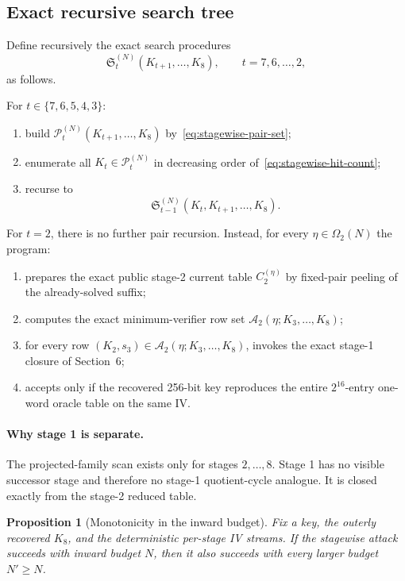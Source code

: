 \documentclass[11pt]{article}
\newtheorem{proposition}{Proposition}
\begin{document}
\subsection{Exact recursive search tree}
Define recursively the exact search procedures
\[
\mathfrak{S}_t^{(N)}(K_{t+1},\dots,K_8),
\qquad t=7,6,\dots,2,
\]
as follows.

For $t\in\{7,6,5,4,3\}$:
\begin{enumerate}[label=\arabic*.,leftmargin=1.5em]
\item build $\mathcal{P}_t^{(N)}(K_{t+1},\dots,K_8)$ by~\eqref{eq:stagewise-pair-set};
\item enumerate all $K_t\in\mathcal{P}_t^{(N)}$ in decreasing order of~\eqref{eq:stagewise-hit-count};
\item recurse to
\[
\mathfrak{S}_{t-1}^{(N)}(K_t,K_{t+1},\dots,K_8).
\]
\end{enumerate}

For $t=2$, there is no further pair recursion. Instead, for every $\eta\in\Omega_2(N)$ the program:
\begin{enumerate}[label=\arabic*.,leftmargin=1.5em]
\item prepares the exact public stage-2 current table $C_2^{(\eta)}$ by fixed-pair peeling of the already-solved suffix;
\item computes the exact minimum-verifier row set $\mathcal{A}_2(\eta;K_3,\dots,K_8)$;
\item for every row $(K_2,s_3)\in \mathcal{A}_2(\eta;K_3,\dots,K_8)$, invokes the exact stage-1 closure of Section~6;
\item accepts only if the recovered 256-bit key reproduces the entire $2^{16}$-entry one-word oracle table on the same IV.
\end{enumerate}

\paragraph{Why stage 1 is separate.}
The projected-family scan exists only for stages $2,\dots,8$. Stage 1 has no visible successor stage and therefore no stage-1 quotient-cycle analogue. It is closed exactly from the stage-2 reduced table.

\begin{proposition}[Monotonicity in the inward budget]
\label{prop:monotone-budget}
Fix a key, the outerly recovered $K_8$, and the deterministic per-stage IV streams. If the stagewise attack succeeds with inward budget $N$, then it also succeeds with every larger budget $N'\ge N$.
\end{proposition}
\end{document}

